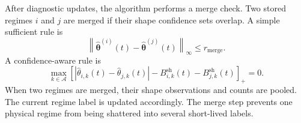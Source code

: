 \documentclass[11pt]{article}
\newcommand{\A}{\mathcal A}
\newcommand{\norm}[1]{\left\lVert #1 \right\rVert}
\newcommand{\abs}[1]{\left\lvert #1 \right\rvert}
\newcommand{\pos}[1]{\left[#1\right]_{+}}
\begin{document}
After diagnostic updates, the algorithm performs a merge check. Two stored regimes $i$ and $j$ are merged if their shape confidence sets overlap. A simple sufficient rule is
\begin{equation}
\label{eq:simple_merge_rule}
\norm{\widehat{\bm\theta}^{(i)}(t)-
\widehat{\bm\theta}^{(j)}(t)}_{\infty}
\leq r_{\mathrm{merge}}.
\end{equation}
A confidence-aware rule is
\begin{equation}
\label{eq:confidence_merge_rule}
\max_{k\in\A}
\pos{
\abs{\widehat\theta_{i,k}(t)-\widehat\theta_{j,k}(t)}
-
B_{i,k}^{\mathrm{sh}}(t)
-
B_{j,k}^{\mathrm{sh}}(t)
}
=0.
\end{equation}
When two regimes are merged, their shape observations and counts are pooled. The current regime label is updated accordingly. The merge step prevents one physical regime from being shattered into several short-lived labels.
\end{document}
